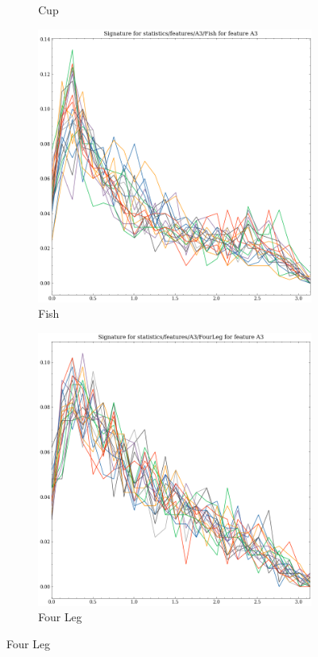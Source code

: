 \begin{figure}[ht]
\begin{subfigure}[b]{0.23\textwidth}
        \caption{Cup}
        \label{fig:features-statistics-A3-j}    
    \end{subfigure}
    \hfill
    \begin{subfigure}[b]{0.23\textwidth}
        \includegraphics[width=\textwidth]{assets/feature_extraction/A3/Fish.png}
        \caption{Fish}
        \label{fig:features-statistics-A3-k}    
    \end{subfigure}
    \hfill
    \begin{subfigure}[b]{0.23\textwidth}
        \includegraphics[width=\textwidth]{assets/feature_extraction/A3/FourLeg.png}
        \caption{Four Leg}
        \label{fig:features-statistics-A3-l}    
    \end{subfigure}
    \hfill


\end{figure}
